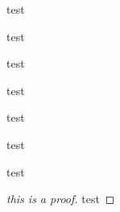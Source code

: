     \begin{lemma}
        test
    \end{lemma}
    \begin{corollary}
        test 
    \end{corollary}
    \begin{question}
        test
    \end{question}
    \begin{conjecture}
        test
    \end{conjecture}

    \begin{example}
        test 
    \end{example}
    \begin{exercise}
        test
    \end{exercise}
    \begin{remark}
        test
    \end{remark}
    \begin{proof}[this is a proof]
        test
    \end{proof}


